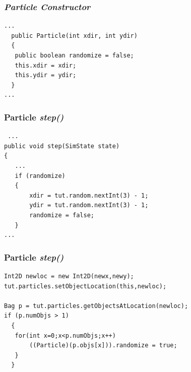 \documentclass[]{beamer}
\begin{document}
\begin{frame}[fragile]
\frametitle{\textit{Particle Constructor}}
\begin{lstlisting}
...
  public Particle(int xdir, int ydir)
  {
   public boolean randomize = false;
   this.xdir = xdir;
   this.ydir = ydir;
  }
...
\end{lstlisting}
\end{frame}

\begin{frame}[fragile]
\frametitle{Particle \textit{step()}}
\begin{lstlisting}
 ...
public void step(SimState state)
{
   ...
   if (randomize)
   {
       xdir = tut.random.nextInt(3) - 1;
       ydir = tut.random.nextInt(3) - 1;
       randomize = false;
   }
...
\end{lstlisting}
\end{frame}

\begin{frame}[fragile]
\frametitle{Particle \textit{step()}}
\begin{lstlisting}
Int2D newloc = new Int2D(newx,newy);
tut.particles.setObjectLocation(this,newloc);

Bag p = tut.particles.getObjectsAtLocation(newloc);
if (p.numObjs > 1)
  {
   for(int x=0;x<p.numObjs;x++)
       ((Particle)(p.objs[x])).randomize = true;
   }
  }
\end{lstlisting}
\end{frame}

\section[DParticle]{}
\end{document}
